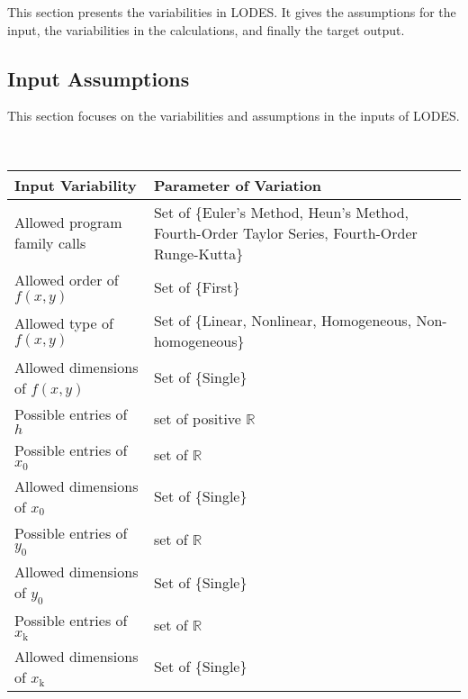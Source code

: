 \documentclass[12pt]{article}
\newcommand{\progname}{LODES} %
\begin{document}
This section presents the variabilities in \progname{}. It gives the assumptions for the input,
the variabilities in the calculations, and finally the target output.

\subsection{Input Assumptions} \label{Sec_ia}

This section focuses on the variabilities and assumptions in the inputs of \progname{}.

~\newline

\noindent
\begin{minipage}{\textwidth}
\renewcommand*{\arraystretch}{1.5}
\begin{tabular}{|p{}| p{}|}
  \hline
  \rowcolor[gray]{0.9}
  Input Variability& Parameter of Variation\\
  \hline
  Allowed program family calls & Set of \{Euler's Method, Heun's Method, Fourth-Order Taylor Series, Fourth-Order Runge-Kutta\}\\
  \hline
  Allowed order of $f(x,y)$ & Set of \{First\} \\
  \hline
  Allowed type of $f(x,y)$ & Set of \{Linear, Nonlinear, Homogeneous, Non-homogeneous\}\\
  \hline
  Allowed dimensions of $f(x,y)$ & Set of \{Single\}\\ 
  \hline
  Possible entries of $h$ & set of positive $\mathbb{R}$\\
  \hline
  Possible entries of $x_\text{0}$ & set of $\mathbb{R}$\\
  \hline
  Allowed dimensions of $x_\text{0}$ & Set of \{Single\}\\
  \hline
  Possible entries of $y_\text{0}$ & set of $\mathbb{R}$\\
  \hline
  Allowed dimensions of $y_\text{0}$ & Set of \{Single\}\\
  \hline
  Possible entries of $x_\text{k}$& set of $\mathbb{R}$\\
  \hline
  Allowed dimensions of $x_\text{k}$ & Set of \{Single\}\\
  \hline
\end{tabular}
\end{minipage}\\
\end{document}
